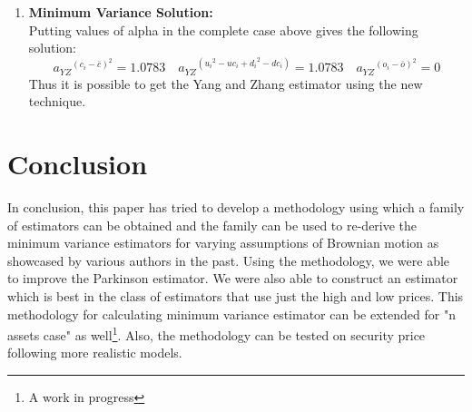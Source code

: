 \documentclass[12pt]{article}   	%
\begin{document}
\begin{enumerate}
\item \textbf{Minimum Variance Solution:}\\
Putting values of alpha in the complete case above gives the following solution:\\
$${a_{YZ}}^{(c_i-\bar{c})^2}=1.0783\quad {a_{YZ}}^{({{u_i}^2-uc_i+{d_i}^2-dc_i})}=1.0783\quad {a_{YZ}}^{(o_i-\bar{o})^2}=0$$
Thus it is possible to get the Yang and Zhang estimator using the new technique.
\end{enumerate}

\section{Conclusion}
In conclusion, this paper has tried to develop a methodology using which a family of estimators can be obtained and the family can be used to 
re-derive the minimum variance estimators for varying assumptions of Brownian motion as showcased by various authors in the past. 
Using the methodology, we were able to improve the Parkinson estimator. We were also able to construct an estimator which is best in the class of estimators that use just the high and low prices. This methodology for calculating minimum variance estimator can be extended for "n assets case" as well\footnote{A work in progress}. Also, the methodology can be tested on security price following more realistic models.\\


\medskip
\newpage


\end{document}
